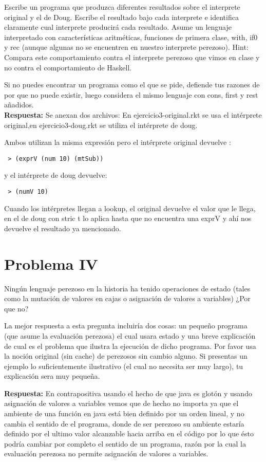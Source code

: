 \documentclass[12pt]{article}
\begin{document}
Escribe un programa que produzca diferentes resultados sobre el interprete original
y el de Doug. Escribe el resultado bajo cada interprete e identifica claramente
cual interprete producirá cada resultado. Asume un lenguaje interpretado
con características aritméticas, funciones de primera clase, with, if0 y rec
(aunque algunas no se encuentren en nuestro interprete perezoso). Hint: Compara
este comportamiento contra el interprete perezoso que vimos en clase y no contra
el comportamiento de Haskell.

Si no puedes encontrar un programa como el que se pide, defiende tus razones
de por que no puede existir, luego considera el mismo lenguaje con cons, first
y rest añadidos.
\\

\textbf{Respuesta: } 
Se anexan dos archivos:
En ejercicio3-original.rkt se usa el intérprete original,en ejercicio3-doug.rkt se utiliza el intérprete de doug.

Ambos utilizan la misma expresión pero el intérprete original devuelve :
\begin{verbatim}
 > (exprV (num 10) (mtSub))
 \end{verbatim}
y el intérprete de doug devuelve:
\begin{verbatim}
 > (numV 10)
 \end{verbatim} 
Cuando los intérpretes llegan a lookup, el original devuelve el valor que le llega, en el de doug con stric t lo aplica hasta que no encuentra una exprV y ahí nos devuelve el resultado ya mencionado.


\section*{Problema IV}
Ningún lenguaje perezoso en la historia ha tenido operaciones de estado (tales
como la mutación de valores en cajas o asignación de valores a variables) ¿Por
que no?

La mejor respuesta a esta pregunta incluiría dos cosas: un pequeño programa (que
asume la evaluación perezosa) el cual usara estado y una breve explicación de cual
es el problema que ilustra la ejecución de dicho programa. Por favor usa la
noción original (sin cache) de perezosos sin cambio alguno. Si presentas un
ejemplo lo suficientemente ilustrativo (el cual no necesita ser muy largo), tu
explicación sera muy pequeña.

\textbf{Respuesta: } En contrapositiva usando el hecho de que java es glotón y usando asignación de valores a variables vemos que de hecho no importa ya que el ambiente de una función en java está bien definido por un orden lineal, y no cambia el sentido de el programa, donde de ser perezoso su ambiente estaría definido por el ultimo valor alcanzable hacia arriba en el código por lo que ésto podría cambiar por completo el sentido de un programa, razón por la cual la evaluación perezosa no permite asignación de valores a variables.
\end{document}
